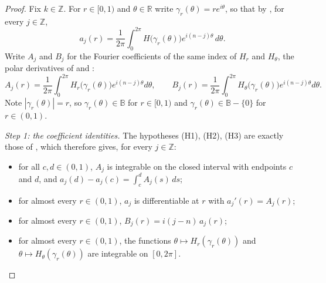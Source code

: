 \begin{proof}
Fix $k\in\mathbb{Z}$.  For $r\in[0,1)$ and $\theta\in\mathbb{R}$ write
$\gamma_r(\theta)=re^{i\theta}$, so that by , for every
$j\in\mathbb{Z}$,
\begin{equation}\tag{0}
  a_j(r)=\frac1{2\pi}\int_0^{2\pi}H\bigl(\gamma_r(\theta)\bigr)e^{i(n-j)\theta}\,d\theta .
\end{equation}
Write $A_j$ and $B_j$ for the Fourier coefficients of the same index of $H_r$
and $H_\theta$, the polar derivatives of  and :
\[
  A_j(r)=\frac1{2\pi}\int_0^{2\pi}H_r\bigl(\gamma_r(\theta)\bigr)e^{i(n-j)\theta}d\theta,
  \qquad
  B_j(r)=\frac1{2\pi}\int_0^{2\pi}H_\theta\bigl(\gamma_r(\theta)\bigr)e^{i(n-j)\theta}d\theta .
\]
Note $|\gamma_r(\theta)|=r$, so $\gamma_r(\theta)\in\mathbb{B}$ for $r\in[0,1)$
and $\gamma_r(\theta)\in\mathbb{B}-\{0\}$ for $r\in(0,1)$.

\emph{Step 1: the coefficient identities.}  The hypotheses (H1), (H2), (H3) are
exactly those of , which therefore gives, for
every $j\in\mathbb{Z}$:
\begin{itemize}
\item[(1b)] for all $c,d\in(0,1)$, $A_j$ is integrable on the closed interval
with endpoints $c$ and $d$, and $a_j(d)-a_j(c)=\int_c^dA_j(s)\,ds$;
\item[(1c)] for almost every $r\in(0,1)$, $a_j$ is differentiable at $r$ with
$a_j'(r)=A_j(r)$;
\item[(1d)] for almost every $r\in(0,1)$, $B_j(r)=i(j-n)\,a_j(r)$;
\item[(1e)] for almost every $r\in(0,1)$, the functions
$\theta\mapsto H_r(\gamma_r(\theta))$ and $\theta\mapsto H_\theta(\gamma_r(\theta))$
are integrable on $[0,2\pi]$.
\end{itemize}


\end{proof}
